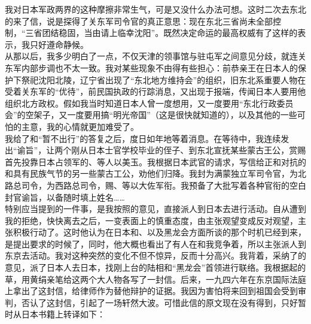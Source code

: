 我对日本军政两界的这种摩擦非常生气，可是又没什么办法可想。这时二次去东北的来了信，说是探得了关东军司令官的真正意思：现在东北三省尚未全部控制，“三省团结稳固，当由请上临幸沈阳”。既然决定命运的最高权威有了这样的表示，我只好遵命静候。\\

从那以后，我多少明白了一点，不仅天津的领事馆与驻屯军之间意见分歧，就连关东军内部步调也不太一致。我对某些现象不由得有些担心：前恭亲王在日本人的保护下祭祀沈阳北陵，辽宁省出现了“东北地方维持会”的组织，旧东北系重要人物在受着关东军的“优待”，前民国执政的行踪消息，又出现于报端，传闻日本人要用他组织北方政权。假如我当时知道日本人曾一度想用，又一度要用“东北行政委员会”的空架子，又一度要用搞“明光帝国”（这是很快就知道的），以及其他的一些可怕的主意，我的心情就更加难受了。\\

我给了和“暂不出行”的答复之后，度日如年地等着消息。在等待中，我连续发出“谕旨”，让两个刚从日本士官学校毕业的侄子、到东北宣抚某些蒙古王公，赏赐首先投靠日本占领军的、等人以美玉。我根据日本武官的请求，写信给正和对抗的和具有民族气节的另一些蒙古工公，劝他们归降。我封为满蒙独立军司令官，为北路总司令，为西路总司令，赐、等以大佐军衔。我预备了大批写着各种官衔的空白封官谕旨，以备随时填上姓名……\\

特别应当提到的一件事，是我按照的意见，直接派人到日本去进行活动。自从遭到我的拒绝，快快离去之后，一变表面上的慎重态度，由主张观望变成反对观望，主张积极行动了。这时他认为在日本和、以及黑龙会方面所谈的那个时机已经到来，是提出要求的时候了，同时，他大概也看出了有人在和我竞争着，所以主张派人到东京去活动。我对这种突然的变化不但不惊异，反而十分高兴。我背着，采纳了的意见，派了日本人去日本，找刚上台的陆相和“黑龙会”首领进行联络。我根据起的草，用黄绢亲笔给这两个大人物各写了一封信。后来，一九四六年在东京国际法庭上拿出了这封信，给律师作为替他辩护的证据。我因为害怕将来回到祖国会受到审判，否认了这封信，引起了一场轩然大波。可惜此信的原文现在没有得到，只好暂时从日本书籍上转译如下：\\

